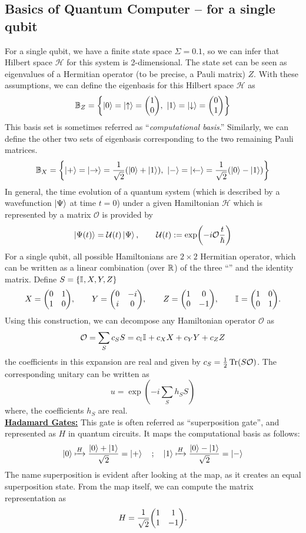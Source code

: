 \documentclass[11pt, oneside, listof=totoc]{scrbook}
\renewcommand{\H}{\mathcal{H}}
\renewcommand{\O}{\mathcal{O}}
\newcommand{\ku}{\ket{0}}
\newcommand{\kd}{\ket{1}}
\newcommand{\kr}{\ket{+}}
\newcommand{\kl}{\ket{-}}
\newcommand{\UU}{\mathcal{U}}
\begin{document}
\subsection{Basics of Quantum Computer -- for a single qubit}
For a single qubit, we have a finite state space \(\Sigma = \qty{0, 1}\), so we can infer that Hilbert space \(\H\) for this system is 2-dimensional. The state set can be seen as eigenvalues of a Hermitian operator (to be precise, a Pauli matrix) \(Z\). With these assumptions, we can define the eigenbasis for this Hilbert space \(\H\) as
\[
    \B_Z = \qty{\ku = \ket{\uparrow} = \mqty(1 \\ 0),~ \kd= \ket{\downarrow} = \mqty(0 \\ 1)}
\]
This basis set is sometimes referred as ``\emph{computational basis}.'' Similarly, we can define the other two sets of eigenbasis corresponding to the two remaining Pauli matrices.
\begin{equation}
    \B_X = \qty{\kr = \ket{\rightarrow} = \frac{1}{\sqrt{2}} \qty(\ku + \kd),~ \kl = \ket{\leftarrow} = \frac{1}{\sqrt{2}} \qty(\ku - \kd)}
\end{equation}
In general, the time evolution of a quantum system (which is described by a wavefunction \(\ket{\Psi}\) at time \(t = 0\)) under a given Hamiltonian \(\mathscr{H}\) which is represented by a matrix \(\O\) is provided by
\[
    \ket{\Psi (t)} = \UU(t) \ket{\Psi}, \qquad \UU(t) := \exp(- i \O \frac{t}{\hslash})
\]
For a single qubit, all possible Hamiltonians are \(2 \times 2\) Hermitian operator, which can be written as a linear combination (over \(\mathbb R\)) of the three ``'' and the identity matrix. Define \(S = \qty{\mathbb{I}_{}, X, Y, Z}\)
\begin{equation}
    X = \mqty(0 & 1 \\ 1 & 0), \qquad Y = \mqty(0 & -i \\ i & 0), \qquad Z = \mqty(1 & 0 \\ 0 & -1), \qquad \I{} = \mqty(1 & 0 \\ 0 & 1).
\end{equation}
Using this construction, we can decompose any Hamiltonian operator \(\O\) as
\[
    \O = \sum_{S} c_S S = c_{\I{}} \I{} + c_X X + c_Y Y + c_Z Z
\]
the coefficients in this expansion are real and given by \(c_S = \half \Tr(S \O)\). The corresponding unitary can be written as
\[
    u = \exp(- i \sum_{S} h_S S)
\]
where, the coefficients \(h_S\) are real.\\
{\bfseries \uline{Hadamard Gates:}} This gate is often referred as ``superposition gate'', and represented as \(H\) in quantum circuits. It maps the computational basis as follows:
\begin{equation*}
    \ku \xmapsto{H} \frac{\ku + \kd}{\sqrt{2}} = \kr \quad ; \quad \kd \xmapsto{H} \frac{\ku - \kd}{\sqrt{2}} = \kl
\end{equation*}
The name superposition is evident after looking at the map, as it creates an equal superposition state. From the map itself, we can compute the matrix representation as
\begin{equation}\label{eq:hadamard}
    H = \frac{1}{\sqrt{2}} \mqty(1 & 1 \\ 1 & -1).
\end{equation}
\end{document}
